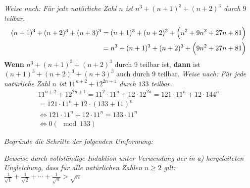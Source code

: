 \documentclass[11pt,largemargins]{homework}
\begin{document}
\maketitle

\question
\textit{Weise nach: Für jede natürliche Zahl \(n\) ist \(n^3+(n+1)^3+(n+2)^3\) durch \(9\) teilbar.}
\begin{align*}
(n+1)^3 + (n+2)^3 + (n+3)^3 &= (n+1)^3 + (n+2)^3 + \Bigl( n^3 + 9n^2 + 27n + 81\Bigr)\\
&= n^3 + (n+1)^3 + (n+2)^3 + \Bigl( 9n^2 + 27n + 81\Bigr)
\end{align*}
\textbf{Wenn} \(n^3 + (n+1)^3 + (n+2)^3\) durch 9 teilbar ist, \textbf{dann} ist \((n+1)^3 + (n+2)^3 + (n+3)^3\) auch durch 9 teilbar.
\question
\textit{Weise nach: Für jede natürliche Zahl \(n\) ist \(11^{n+2}+12^{2n+1}\) durch \(133\) teilbar.}
\begin{align*}
11^{n+2}+12^{2n+1}=11^2\cdot 11^n+12\cdot 12^{2n} = 121 \cdot 11^n + 12 \cdot 144^n \\
= 121\cdot 11^n + 12\cdot(133+11)^n \\
\Longleftrightarrow 121\cdot 11^n+12\cdot11^n = 133\cdot 11^n \\
\Longleftrightarrow 0 (\mod 133)
\end{align*}
\question
\begin{alphaparts}
	\questionpart \textit{Begründe die Schritte der folgenden Umformung:}
\end{alphaparts}
\begin{alphaparts}
	\questionpart \textit{Beweise durch vollständige Induktion unter Verwendung der in a) hergeleiteten Ungleichung, dass für alle natürlichen Zahlen \(n\geq2\) gilt: \(\frac{1}{\sqrt{1}}+\frac{1}{\sqrt{2}}+\cdots+\frac{1}{\sqrt{n}}>\sqrt{n}\)}
\end{alphaparts}
\end{document}

